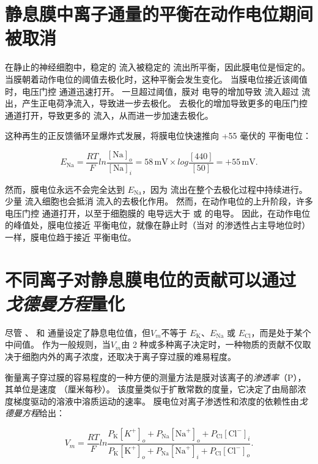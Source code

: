 \section{静息膜中离子通量的平衡在动作电位期间被取消}

在静止的神经细胞中，稳定的  流入被稳定的  流出所平衡，因此膜电位是恒定的。 
当膜朝着动作电位的阈值去极化时，这种平衡会发生变化。 
当膜电位接近该阈值时，电压门控  通道迅速打开。 
一旦超过阈值，膜对  电导的增加导致  流入超过  流出，产生正电荷净流入，导致进一步去极化。 
去极化的增加导致更多的电压门控  通道打开，导致更多的  流入，从而进一步加速去极化。


这种再生的正反馈循环呈爆炸式发展，将膜电位快速推向 +55 毫伏的  平衡电位：

\begin{equation} \label{eq:9_equilibrium_potential}
	E_{\text{Na}} = \frac{RT}{F} ln\frac{[\text{Na}]_o}{[\text{Na}]_i}
		   = 58 \, \text{mV} \times log\frac{[440]}{[50]}
		   = +55 \, \text{mV}.
\end{equation}



然而，膜电位永远不会完全达到 $E_\text{Na}$，因为  流出在整个去极化过程中持续进行。 
少量  流入细胞也会抵消  流入的去极化作用。
然而，在动作电位的上升阶段，许多电压门控  通道打开，以至于细胞膜的  电导远大于  或  的电导。 
因此，在动作电位的峰值处，膜电位接近  平衡电位，就像在静止时（当对  的渗透性占主导地位时）一样，膜电位趋于接近  平衡电位。


\section{不同离子对静息膜电位的贡献可以通过\textit{戈德曼方程}量化}
尽管 、 和  通量设定了静息电位值，但$V_m$不等于 $E_\text{K}$、$E_\text{Na}$ 或 $E_\text{Cl}$，而是处于某个中间值。 
作为一般规则，当$V_m$由 2 种或多种离子决定时，一种物质的贡献不仅取决于细胞内外的离子浓度，还取决于离子穿过膜的难易程度。


衡量离子穿过膜的容易程度的一种方便的测量方法是膜对该离子的\textit{渗透率}（P），其单位是速度 （厘米每秒）。 
该度量类似于扩散常数的度量，它决定了由局部浓度梯度驱动的溶液中溶质运动的速率。
膜电位对离子渗透性和浓度的依赖性由\textit{戈德曼方程}给出：

\begin{equation} \label{eq:9_Goldman_Equation}
	V_m = \frac{RT}{F}
		ln \frac{
			P_\text{K} [K^+]_o + 
			P_\text{Na}[\text{Na}^+]_o + 
			P_\text{Cl}[\text{Cl}^-]_i
		}
		{
			P_\text{K} [\text{K}^+]_o + 
			P_\text{Na}[\text{Na}^+]_i + 
			P_\text{Cl}[\text{Cl}^-]_o
		}.
\end{equation}


